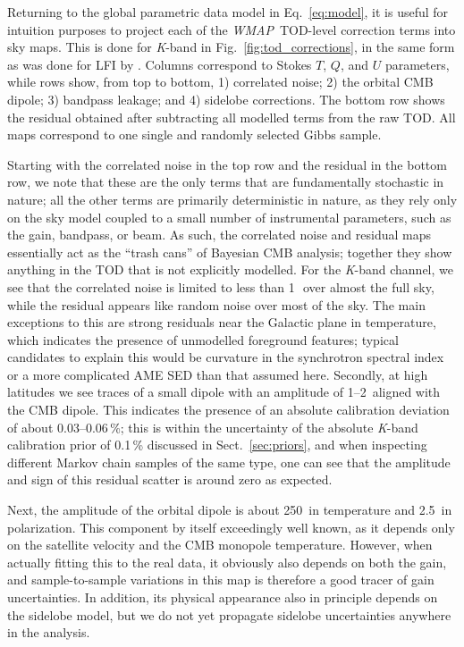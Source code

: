 \documentclass[twocolumn]{../../common/aa}
\def\WMAP{\emph{WMAP}}
\newcommand{\K}[0]{\textit K}
\begin{document}
Returning to the global parametric data model in Eq.~\eqref{eq:model}, it is useful for intuition purposes to project each of the \WMAP\ TOD-level correction terms into sky maps. This is done for \K-band in Fig.~\ref{fig:tod_corrections}, in the same form as was done for LFI by \citet{bp10}. Columns correspond to Stokes $T$, $Q$, and $U$ parameters, while rows show, from top to bottom, 1) correlated noise; 2) the orbital CMB dipole; 3) bandpass leakage; and 4) sidelobe corrections. The bottom row shows the residual obtained after subtracting all modelled terms from the raw TOD. All maps correspond to one single and randomly selected Gibbs sample.

Starting with the correlated noise in the top row and the residual in the bottom row, we note that these are the only terms that are fundamentally stochastic in nature; all the other terms are primarily deterministic in nature, as they rely only on the sky model coupled to a small number of instrumental parameters, such as the gain, bandpass, or beam. As such, the correlated noise and residual maps essentially act as the ``trash cans'' of Bayesian CMB analysis; together they show anything in the TOD that is not explicitly modelled. For the \K-band channel, we see that the correlated noise is limited to less than 1\,\muK\ over almost the full sky, while the residual appears like random noise over most of the sky. The main exceptions to this are strong residuals near the Galactic plane in temperature, which indicates the presence of unmodelled foreground features; typical candidates to explain this would be curvature in the synchrotron spectral index or a more complicated AME SED than that assumed here. Secondly, at high latitudes we see traces of a small dipole with an amplitude of 1--2\muK\ aligned with the CMB dipole. This indicates the presence of an absolute calibration deviation of about 0.03--0.06\,\%; this is within the uncertainty of the absolute \K-band calibration prior of 0.1\,\% discussed in Sect.~\ref{sec:priors}, and when inspecting different Markov chain samples of the same type, one can see that the amplitude and sign of this residual scatter is around zero as expected.

Next, the amplitude of the orbital dipole is about 250\muK\ in temperature and 2.5\muK\ in polarization. This component by itself exceedingly well known, as it depends only on the satellite velocity and the CMB monopole temperature. However, when actually fitting this to the real data, it obviously also depends on both the gain, and sample-to-sample variations in this map is therefore a good tracer of gain uncertainties. In addition, its physical appearance also in principle depends on the sidelobe model, but we do not yet propagate sidelobe uncertainties anywhere in the analysis.
\end{document}
